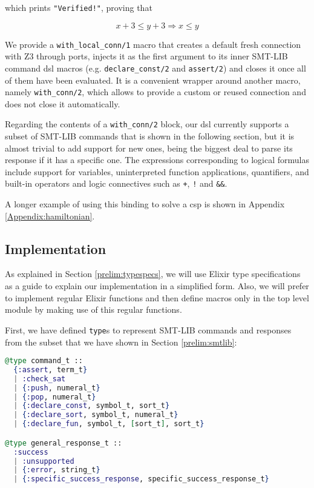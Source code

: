 which prints \verb|"Verified!"|, proving that 

$$x + 3\leq y + 3 \Rightarrow x \leq y$$

We provide a \verb|with_local_conn/1| macro that creates a default fresh
connection with Z3 through ports, injects it as the first argument to its inner
SMT-LIB command \gls{dsl} macros (e.g. \verb|declare_const/2| and
\verb|assert/2|) and closes it once all of them have been evaluated. It is a
convenient wrapper around another macro, namely \verb|with_conn/2|, which allows
to provide a custom or reused connection and does not close it automatically.

Regarding the contents of a \verb|with_conn/2| block, our \gls{dsl} currently
supports a subset of SMT-LIB commands that is shown in the following section,
but it is almost trivial to add support for new ones, being the biggest deal to
parse its response if it has a specific one.  The expressions corresponding to
logical formulas include support for variables, uninterpreted function
applications, quantifiers, and built-in operators and logic connectives such as
\verb|+|, \verb|!| and \verb|&&|.

A longer example of using this binding to solve a \gls{csp} is shown in Appendix
\ref{Appendix:hamiltonian}.

\subsection{Implementation}

As explained in Section \ref{prelim:typespecs}, we will use Elixir type
specifications as a guide to explain our implementation in a simplified form.
Also, we will prefer to implement regular Elixir functions and then define 
macros only in the top level module by making use of this regular functions.

First, we have defined \verb|type|s to represent SMT-LIB commands and responses
from the subset that we have shown in Section \ref{prelim:smtlib}:

\begin{lstlisting}[language=elixir,numbers=none,frame=none]
@type command_t ::
  {:assert, term_t}
  | :check_sat
  | {:push, numeral_t}
  | {:pop, numeral_t}
  | {:declare_const, symbol_t, sort_t}
  | {:declare_sort, symbol_t, numeral_t}
  | {:declare_fun, symbol_t, [sort_t], sort_t}

@type general_response_t ::
  :success
  | :unsupported
  | {:error, string_t}
  | {:specific_success_response, specific_success_response_t}
\end{lstlisting}

